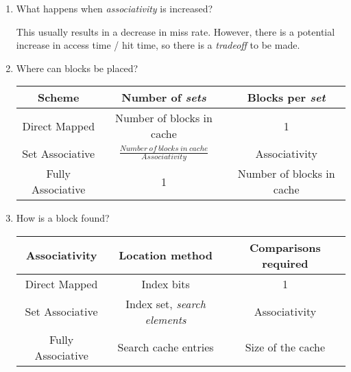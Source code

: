 \documentclass[12pt]{article}
\newenvironment{QandA}{\begin{enumerate}[label=\bfseries\arabic*.]\bfseries}
                      {\end{enumerate}}
\newenvironment{answered}{\par\quad\normalfont}{}
\begin{document}
\begin{QandA}
\begin{answered}
\quad In a set-associative cache, there are a fixed number of locations where each block can be placed. A set-associative cache with \textit{n} locations for a block is called a \textit{n}-way set associative cache. An \textit{n}-way set-associative cache consists of a number of \textbf{sets}, each of which consists of \textit{n} blocks. Each block in the memory maps to a unique \textbf{set} in the cache. 
\begin{equation*}
    \text{location} = (\text{block address})\ \%\ (\text{number of \textit{sets} in the cache})
\end{equation*}
\vspace{-0.85cm}
\end{answered}

\item What happens when \textit{associativity} is increased?
\begin{answered}
This usually results in a decrease in miss rate. However, there is a potential increase in access time / hit time, so there is a \textit{tradeoff} to be made. 
\end{answered}

\item Where can blocks be placed?
\begin{answered}
\vspace{-0.85cm}
\begin{center}
 \begin{tabular}{||c c c||} 
 \hline
 Scheme & Number of \textit{sets} & Blocks per \textit{set}\\ [0.5ex] 
 \hline\hline
 Direct Mapped & Number of blocks in cache & 1\\ 
 \hline
 Set Associative & $\frac{Number\ of\ blocks\ in\ cache}{Associativity}$ & Associativity\\
 \hline
 Fully Associative & 1 & Number of blocks in cache\\ [1ex] 
 \hline
\end{tabular}
\end{center}
\end{answered}

\newpage 

\item How is a block found?
\begin{answered}
\vspace{-0.85cm}
\begin{center}
 \begin{tabular}{||c c c||} 
 \hline
 Associativity & Location method & Comparisons required\\ [0.5ex] 
 \hline\hline
 Direct Mapped & Index bits & 1\\ 
 \hline
 Set Associative & Index set, \textit{search elements} & Associativity\\
 \hline
 Fully Associative & Search cache entries & Size of the cache\\ [1ex] 
 \hline
\end{tabular}
\end{center}
\end{answered}


\end{QandA}
\end{document}
